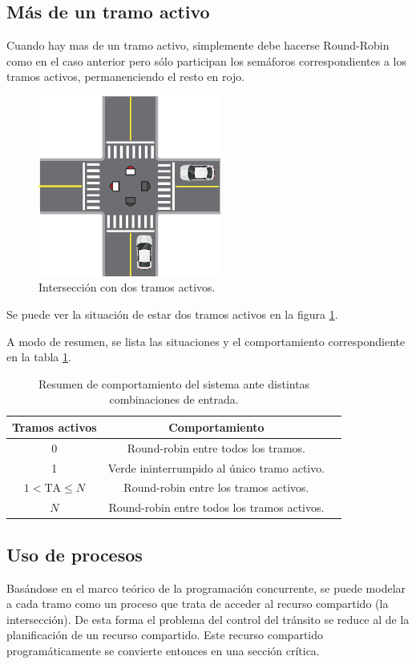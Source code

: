 \subsection{Más de un tramo activo}
Cuando hay mas de un tramo activo, simplemente debe hacerse Round-Robin como en el caso anterior pero sólo participan los semáforos correspondientes a los tramos activos, permanenciendo el resto en rojo.
\begin{figure}[htbp]
	\centering
	\includegraphics[width=6cm]{imagenes/dos-activos.eps}
	\caption{Intersección con dos tramos activos.}
	\label{fig:dos-activos}
\end{figure}

Se puede ver la situación de estar dos tramos activos en la figura \ref{fig:dos-activos}.

A modo de resumen, se lista las situaciones y el comportamiento correspondiente en la tabla \ref{tab:comportamiento}.

\begin{table}[htbp]
	\centering
	\caption{Resumen de comportamiento del sistema ante distintas combinaciones de entrada.}
	\vspace{0.25cm}
	\label{tab:comportamiento}
	\begin{tabular}{ccp{7cm}}
		\toprule
		\bf{Tramos activos} & \bf{Comportamiento} \\
		\midrule
		0 & Round-robin entre todos los tramos. \\
		1 & Verde ininterrumpido al único tramo activo. \\
		$1 < \mbox{TA} \le N$ & Round-robin entre los tramos activos. \\
		$N$ & Round-robin entre todos los tramos activos. \\
		\bottomrule
	\end{tabular}
\end{table}

\subsection{Uso de procesos}
Basándose en el marco teórico de la programación concurrente, se puede modelar a cada tramo como un proceso que trata de acceder al recurso compartido (la intersección). De esta forma el problema del control del tránsito se reduce al de la planificación de un recurso compartido. Este recurso compartido programáticamente se convierte entonces en una sección crítica.


